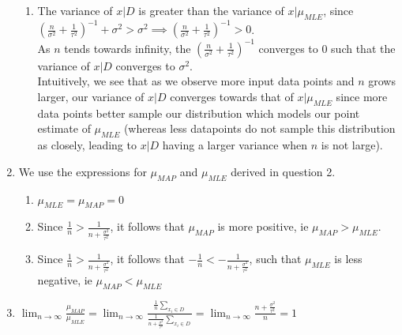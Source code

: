 \documentclass[submit]{harvardml}
\begin{document}
\begin{enumerate}
\begin{enumerate}
        \item The variance of $x | D$ is greater than the variance of $x | \mu_{MLE}$, since $(\frac{n}{\sigma^2} + \frac{1}{\tau^2})^{-1} + \sigma^2 > \sigma^2 \implies (\frac{n}{\sigma^2} + \frac{1}{\tau^2})^{-1} > 0$. \\
        As $n$ tends towards infinity, the $(\frac{n}{\sigma^2} + \frac{1}{\tau^2})^{-1}$ converges to $0$ such that the variance of $x | D$ converges to $\sigma^2$. \\
        Intuitively, we see that as we observe more input data points and $n$ grows larger, our variance of $x | D$ converges towards that of $x | \mu_{MLE}$ since more data points better sample our distribution which models our point estimate of $\mu_{MLE}$ (whereas less datapoints do not sample this distribution as closely, leading to $x |D$ having a larger variance when $n$ is not large).
        
    \end{enumerate}
    \item  We use the expressions for $\mu_{MAP}$ and $\mu_{MLE}$ derived in question 2.
    \begin{enumerate} \\
        \item $ \mu_{MLE} = \mu_{MAP} = 0 $
        \item Since $\frac{1}{n} > \frac{1}{n + \frac{\sigma^2}{\tau^2}}$, it follows that $\mu_{MAP}$ is more positive, ie $\mu_{MAP} > \mu_{MLE}$. 
        \item  Since $\frac{1}{n} > \frac{1}{n + \frac{\sigma^2}{\tau^2}}$, it follows that $-\frac{1}{n} < -\frac{1}{n + \frac{\sigma^2}{\tau^2}}$, such that $\mu_{MLE}$ is less negative, ie  $\mu_{MAP} < \mu_{MLE}$
    \end{enumerate}
    \item $\lim_{n \rightarrow \infty} \frac{\mu_{MAP}}{\mu_{MLE}} = \lim_{n \rightarrow \infty} \frac{\frac{1}{n}\sum_{x_i \in D}}{\frac{1}{n + \frac{\sigma^2}{\tau^2}}\sum_{x_i \in D}} = \lim_{n \rightarrow \infty} \frac{n + \frac{\sigma^2}{\tau^2}}{n} = 1$ 

\end{enumerate}

\newpage
\end{document}
